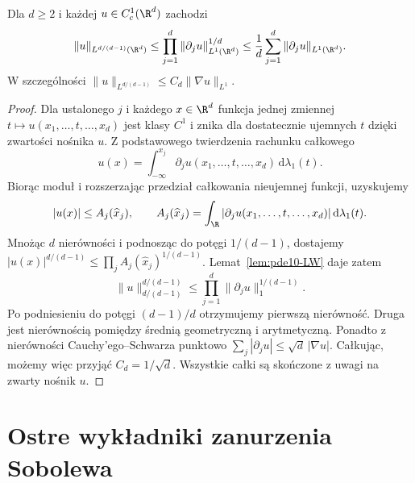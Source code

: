 \begin{twierdzenie}[Nierówność Sobolewa dla $p=1$]
\label{thm:pde10-Sob1}
Dla $d\ge2$ i każdej $u\in C_c^1(\R^d)$ zachodzi
\[
 \|u\|_{L^{d/(d-1)}(\R^d)}
 \le\prod_{j=1}^d\|\partial_j u\|_{L^1(\R^d)}^{1/d}
 \le \frac1d\sum_{j=1}^d\|\partial_j u\|_{L^1(\R^d)}.
\]
W szczególności $\|u\|_{L^{d/(d-1)}}\le C_d\|\nabla u\|_{L^1}$.
\end{twierdzenie}
\begin{proof}
Dla ustalonego $j$ i każdego $x\in\R^d$ funkcja jednej
zmiennej $t\mapsto u(x_1,\ldots,t,\ldots,x_d)$ jest
klasy $C^1$ i znika dla dostatecznie ujemnych $t$ dzięki
zwartości nośnika $u$. Z podstawowego twierdzenia
rachunku całkowego
\[
 u(x)=\int_{-\infty}^{x_j}
 \partial_j u(x_1,\ldots,t,\ldots,x_d)\,\mathrm d\lambda_1(t).
\]
Biorąc moduł i rozszerzając przedział całkowania
nieujemnej funkcji, uzyskujemy
\[
 |u(x)|\le A_j(\widehat x_j),\qquad
 A_j(\widehat x_j)=\int_{\R}
 |\partial_j u(x_1,\ldots,t,\ldots,x_d)|\,\mathrm d\lambda_1(t).
\]
Mnożąc $d$ nierówności i podnosząc do potęgi $1/(d-1)$,
dostajemy $|u(x)|^{d/(d-1)}\le\prod_j
A_j(\widehat x_j)^{1/(d-1)}$. Lemat~\ref{lem:pde10-LW}
daje zatem
\[
 \|u\|_{d/(d-1)}^{d/(d-1)}
 \le \prod_{j=1}^d\|\partial_j u\|_1^{1/(d-1)}.
\]
Po podniesieniu do potęgi $(d-1)/d$ otrzymujemy pierwszą
nierówność. Druga jest nierównością pomiędzy średnią
geometryczną i arytmetyczną. Ponadto z nierówności
Cauchy'ego--Schwarza punktowo
$\sum_j|\partial_j u|\le\sqrt d\,|\nabla u|$.
Całkując, możemy więc przyjąć $C_d=1/\sqrt d$.
Wszystkie całki są skończone
z uwagi na zwarty nośnik $u$.
\end{proof}

\section{Ostre wykładniki zanurzenia Sobolewa}
\label{sec:pde10-Sobolev}

